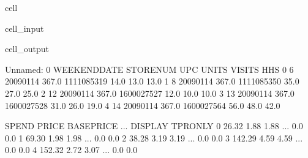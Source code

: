 \documentclass[letterpaper,10pt,english]{jupyterBook}
\begin{document}
\begin{sphinxuseclass}{cell}\begin{sphinxVerbatimInput}

\begin{sphinxuseclass}{cell_input}
\begin{sphinxVerbatim}[commandchars=\\\{\}]
  

  
\PYG{p}{[}\PYG{p}{]}  \PYG{p}{[}\PYG{p}{]}
\end{sphinxVerbatim}

\end{sphinxuseclass}\end{sphinxVerbatimInput}
\begin{sphinxVerbatimOutput}

\begin{sphinxuseclass}{cell_output}
\begin{sphinxVerbatim}[commandchars=\\\{\}]
   Unnamed: 0 WEEK\PYGZus{}END\PYGZus{}DATE  STORE\PYGZus{}NUM         UPC  UNITS  VISITS   HHS  \PYGZbs{}
0           6    2009\PYGZhy{}01\PYGZhy{}14      367.0  1111085319   14.0    13.0  13.0   
1           8    2009\PYGZhy{}01\PYGZhy{}14      367.0  1111085350   35.0    27.0  25.0   
2          12    2009\PYGZhy{}01\PYGZhy{}14      367.0  1600027527   12.0    10.0  10.0   
3          13    2009\PYGZhy{}01\PYGZhy{}14      367.0  1600027528   31.0    26.0  19.0   
4          14    2009\PYGZhy{}01\PYGZhy{}14      367.0  1600027564   56.0    48.0  42.0   

    SPEND  PRICE  BASE\PYGZus{}PRICE  ...  DISPLAY  TPR\PYGZus{}ONLY  \PYGZbs{}
0   26.32   1.88        1.88  ...      0.0       0.0   
1   69.30   1.98        1.98  ...      0.0       0.0   
2   38.28   3.19        3.19  ...      0.0       0.0   
3  142.29   4.59        4.59  ...      0.0       0.0   
4  152.32   2.72        3.07  ...      0.0       0.0   


\end{sphinxVerbatim}
\end{sphinxuseclass}
\end{sphinxVerbatimOutput}
\end{sphinxuseclass}
\end{document}
